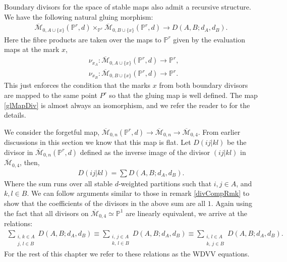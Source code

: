\begin{remark}
    Boundary divisors for the space of stable maps also admit a recursive structure.
    We have the following natural gluing morphism:
    \begin{align}
        \overline{\mathcal{M}}_{0,A\cup\{x\}}(\mathbb{P}^{r},d) \times_{\mathbb{P}^{r}}\overline{\mathcal{M}}_{0,B\cup\{x\}} (\mathbb{P}^{r},d) \to D(A,B;d_{A},d_{B}). \label{glMapDiv}
    \end{align}
    Here the fibre products are taken over the maps to $\mathbb{P}^{r}$ given by the evaluation maps at the mark $x$, 
    \begin{align*}
        &\nu_{x_A}:\overline{\mathcal{M}}_{0,A\cup\{x\}}(\mathbb{P}^{r},d) \to \mathbb{P}^{r},\\
        &\nu_{x_B}:\overline{\mathcal{M}}_{0,B\cup\{x\}}(\mathbb{P}^{r},d) \to \mathbb{P}^{r}.
    \end{align*}
    This just enforces the condition that the marks $x$ from both boundary divisors are mapped to the same point $P^{r}$ so that the gluing map is well defined. 
    The map \ref{glMapDiv} is almost always an isomorphism, and we refer the reader to \cite{FPnotes} for the details.
\end{remark}

\begin{remark}
    We consider the forgetful map, $\overline{\mathcal{M}}_{0,n}(\mathbb{P}^{r},d)\to \overline{\mathcal{M}}_{0,n} \to \overline{\mathcal{M}}_{0,4}$.
    From earlier discussions in this section we know that this map is flat.
    Let $D(ij|kl)$ be the divisor in $\overline{\mathcal{M}}_{0,n}(\mathbb{P}^{r},d)$ defined as the inverse image of the divisor $(ij|kl)$ in $\overline{\mathcal{M}}_{0,4}$, then,
    \begin{align*}
        D(ij|kl) = \sum D(A,B;d_{A},d_{B}).
    \end{align*}
    Where the sum runs over all stable $d$-weighted partitions such that $i,j \in A$, and $k,l \in B$.
    We can follow arguments similar to those in remark \ref{divCompRmk} to show that the coefficients of the divisors in the above sum are all $1$.
    Again using the fact that all divisors on $\overline{\mathcal{M}}_{0,4}\simeq \mathbb{P}^{1}$ are linearly equivalent, we arrive at the relations:
    \begin{align*}
        \sum_{\substack{i,\,k \in A \\j,\,l \in B}} D(A,B;d_{A},d_{B}) \equiv \sum_{\substack{i,\,j \in A \\k,\,l \in B}} D(A,B;d_{A},d_{B}) \equiv \sum_{\substack{i,\,l \in A \\k,\,j \in B}} D(A,B;d_{A},d_{B}).
    \end{align*}
    For the rest of this chapter we refer to these relations as the WDVV equations.
\end{remark}

